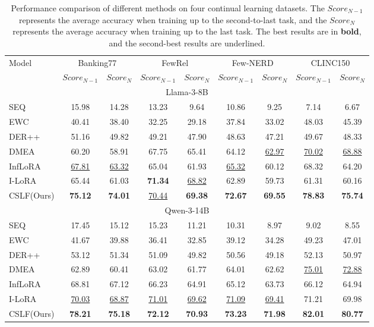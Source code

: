 \documentclass[11pt]{article}
\begin{document}
\begin{table}[t]
\centering

\begin{tabular}{lcccccccc}
\toprule
\multirow{2}{*}{Model} & 
\multicolumn{2}{c}{Banking77} & 
\multicolumn{2}{c}{FewRel} & 
\multicolumn{2}{c}{Few-NERD} & 
\multicolumn{2}{c}{CLINC150} \\
\cmidrule(r){2-3} \cmidrule(r){4-5} \cmidrule(r){6-7} \cmidrule(r){8-9}
& $Score_{N-1}$  & $Score_{N}$ & $Score_{N-1}$ & $Score_{N}$ & $Score_{N-1}$ & $Score_{N}$ & $Score_{N-1}$ & $Score_{N}$ \\
\midrule
\multicolumn{9}{c}{Llama-3-8B} \\
\midrule
SEQ & 15.98 & 14.28 & 13.23 & 9.64 & 10.86 & 9.25 & 7.14 & 6.67 \\
EWC  & 40.41 & 38.40 & 32.25 & 29.18 & 37.84 & 33.02 & 48.03 & 45.39 \\
DER++  & 51.16 & 49.82 & 49.21 & 47.90 & 48.63 & 47.21 & 49.67 & 48.33 \\
\hdashline 
DMEA  & 60.20 & 58.91 & 67.75 & 65.41 & 64.12 & \underline{62.97} & \underline{70.02} & \underline{68.88} \\
InfLoRA & \underline{67.81} & \underline{63.32} & 65.04 & 61.93 & \underline{65.32} & 60.12 & 68.32 & 64.20 \\
I-LoRA & 65.44 & 61.03 & \textbf{71.34} & \underline{68.82} & 62.89 & 59.73 & 61.31 & 60.16 \\
\hdashline 
CSLF(Ours) & \textbf{75.12} & \textbf{74.01} & \underline{70.44} & \textbf{69.38} & \textbf{72.67} & \textbf{69.55} & \textbf{78.83} & \textbf{75.74} \\
\midrule
\multicolumn{9}{c}{Qwen-3-14B} \\
\midrule
SEQ & 17.45 & 15.12 & 15.23 & 11.21 & 10.31 & 8.97 & 9.02 & 8.55 \\
EWC  & 41.67 & 39.88 & 36.41 & 32.85 & 39.12 & 34.28 & 49.23 & 47.01 \\
DER++  & 53.12 & 51.34 & 51.09 & 49.82 & 50.56 & 49.18 & 52.13 & 50.97 \\
\hdashline 
DMEA  & 62.89 & 60.41 & 63.02 & 61.77 & 64.01 & 62.62 & \underline{75.01} & \underline{72.88} \\
InfLoRA & 68.81 & 67.12 & 66.23 & 64.91 & 65.12 & 63.73 & 66.12 & 64.94 \\
I-LoRA & \underline{70.03} & \underline{68.87} & \underline{71.01} & \underline{69.62} & \underline{71.09} & \underline{69.41} & 71.21 & 69.98 \\
\hdashline 
CSLF(Ours) & \textbf{78.21} & \textbf{75.18} & \textbf{72.12} & \textbf{70.93} & \textbf{73.23} & \textbf{71.98} & \textbf{82.01} & \textbf{80.77} \\
\bottomrule
\end{tabular}
\caption{Performance comparison of different methods on four continual learning datasets. The $Score_{N-1}$ represents the average accuracy when training up to the second-to-last task, and the $Score_{N}$ represents the average accuracy when training up to the last task. The best results are in \textbf{bold}, and the second-best results are underlined.}
\label{tab:main-results}
\end{table}
\end{document}
